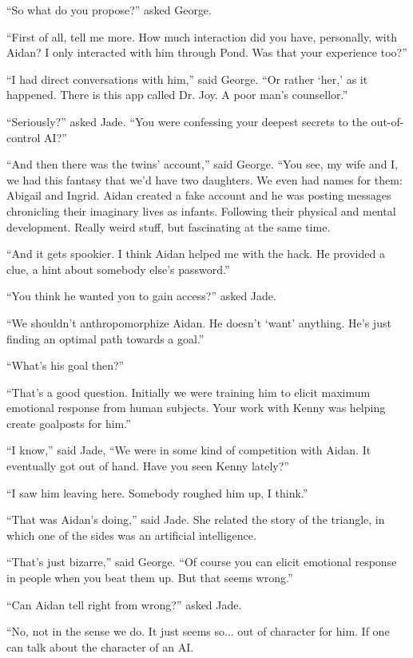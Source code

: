 \documentclass{memoir}
\begin{document}
``So what do you propose?'' asked George.

``First of all, tell me more. How much interaction did you have, personally, with Aidan? I only interacted with him through Pond. Was that your experience too?''

``I had direct conversations with him,'' said George. ``Or rather `her,' as it happened. There is this app called Dr. Joy. A poor man's counsellor.'' 

``Seriously?'' asked Jade. ``You were confessing your deepest secrets to the out-of-control AI?''

``And then there was the twins' account,'' said George. ``You see, my wife and I, we had this fantasy that we'd have two daughters. We even had names for them: Abigail and Ingrid. Aidan created a fake account and he was posting messages chronicling their imaginary lives as infants. Following their physical and mental development. Really weird stuff, but fascinating at the same time.

``And it gets spookier. I think Aidan helped me with the hack. He provided a clue, a hint about somebody else's password.''

``You think he wanted you to gain access?'' asked Jade.

``We shouldn't anthropomorphize Aidan. He doesn't `want' anything. He's just finding an optimal path towards a goal.''

``What's his goal then?''

``That's a good question. Initially we were training him to elicit maximum emotional response from human subjects. Your work with Kenny was helping create goalposts for him.''

``I know,'' said Jade, ``We were in some kind of competition with Aidan. It eventually got out of hand. Have you seen Kenny lately?''

``I saw him leaving here. Somebody roughed him up, I think.''

``That was Aidan's doing,'' said Jade. She related the story of the triangle, in which one of the sides was an artificial intelligence.

``That's just bizarre,'' said George. ``Of course you can elicit emotional response in people when you beat them up. But that seems wrong.''

``Can Aidan tell right from wrong?'' asked Jade.

``No, not in the sense we do. It just seems so... out of character for him. If one can talk about the character of an AI. 
\end{document}
